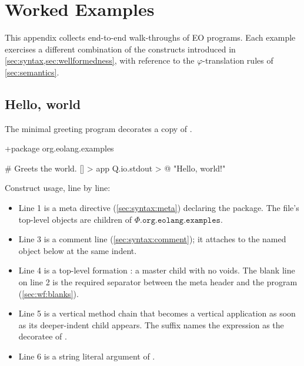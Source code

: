 
\section{Worked Examples}\label{app:examples}

This appendix collects end-to-end walk-throughs of EO programs.
Each example exercises a different combination of the constructs introduced
  in \cref{sec:syntax,sec:wellformedness}, with reference to the
  \(\varphi\)-translation rules of \cref{sec:semantics}.

\subsection{Hello, world}\label{app:ex:hello}

The minimal greeting program decorates a copy of .

\begin{ffcode}
+package org.eolang.examples

# Greets the world.
[] > app
  Q.io.stdout > @
    "Hello, world!\n"
\end{ffcode}

Construct usage, line by line:

\begin{itemize}
  \item Line 1 is a meta directive (\cref{sec:syntax:meta}) declaring the
    package. The file's top-level objects are children of
    \(\Phi.\mathtt{org}.\mathtt{eolang}.\mathtt{examples}\).
  \item Line 3 is a comment line (\cref{sec:syntax:comment}); it attaches
    to the named object below at the same indent.
  \item Line 4 is a top-level formation : a master child with
    no voids. The blank line on line 2 is the required separator between
    the meta header and the program (\cref{sec:wf:blanks}).
  \item Line 5 is a vertical method chain  that becomes a
    vertical application as soon as its deeper-indent child appears.
    The suffix  names the expression as the decoratee of .
  \item Line 6 is a string literal argument of .
\end{itemize}

